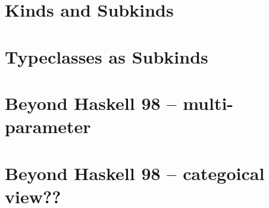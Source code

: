 \documentclass[runningheads]{llncs}
\begin{document}


\section{Kinds and Subkinds}


\section{Typeclasses as Subkinds}


\section{Beyond Haskell 98 -- multi-parameter}

\section{Beyond Haskell 98 -- categoical view??}




\end{document}

